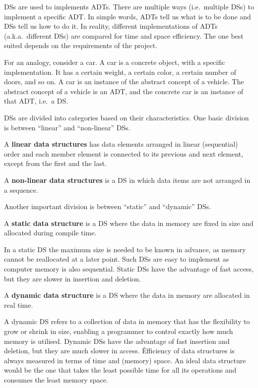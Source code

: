 DSs are used to implements ADTs. There are multiple ways (i.e.\ multiple DSs) to implement a specific ADT. In simple
words, ADTs tell us what is to be done and DSs tell us how to do it. In reality, different implementations of ADTs
(a.k.a.\ different DSs) are compared for time and space efficiency. The one best suited depends on the requirements of
the project.

\be
For an analogy, consider a car. A car is a concrete object, with a specific implementation. It has a certain weight,
a certain color, a certain number of doors, and so on. A car is an instance of the abstract concept of a vehicle. The
abstract concept of a vehicle is an ADT, and the concrete car is an instance of that ADT, i.e.\ a DS\@.
\ee

DSs are divided into categories based on their characteristics. One basic division is between ``linear''
and ``non-linear'' DSs.

A \textbf{linear data structures} has data elements arranged in linear (sequential) order and each member element is
connected to its previous and next element, except from the first and the last.
\ed

A \textbf{non-linear data structures} is a DS in which data items are not arranged in a sequence.
\ed

Another important division is between ``static'' and ``dynamic'' DSs.

A \textbf{static data structure} is a DS where the data in memory are fixed in size and allocated during compile time.
\ed

In a static DS the maximum size is needed to be known in advance, as memory cannot be reallocated at a later point. Such
DSs are easy to implement as computer memory is also sequential. Static DSs have the advantage of fast access, but they
are slower in insertion and deletion.

A \textbf{dynamic data structure} is a DS where the data in memory are allocated in real time.
\ed

A dynamic DS refers to a collection of data in memory that has the flexibility to grow or shrink in size, enabling a
programmer to control exactly how much memory is utilised. Dynamic DSs have the advantage of fast insertion and
deletion, but they are much slower in access. \v

Efficiency of data structures is always measured in terms of time and (memory) space. An ideal data structure would
be the one that takes the least possible time for all its operations and consumes the least memory space.